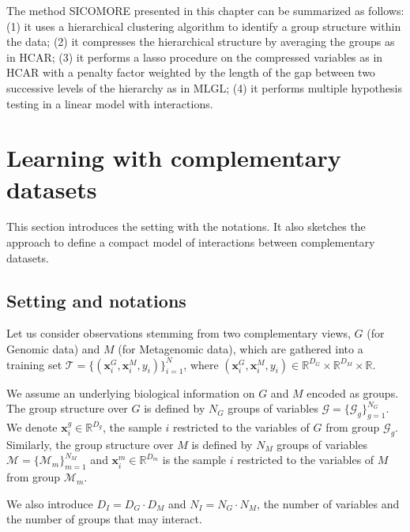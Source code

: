 \documentclass[]{book}
\begin{document}
The method SICOMORE presented in this chapter can be summarized as
follows: (1) it uses a hierarchical clustering algorithm to identify a
group structure within the data; (2) it compresses the hierarchical
structure by averaging the groups as in HCAR; (3) it performs a lasso
procedure on the compressed variables as in HCAR with a penalty factor
weighted by the length of the gap between two successive levels of the
hierarchy as in MLGL; (4) it performs multiple hypothesis testing in a
linear model with interactions.

\hypertarget{modelsicomore}{%
\section{Learning with complementary datasets}\label{modelsicomore}}

This section introduces the setting with the notations. It also sketches
the approach to define a compact model of interactions between
complementary datasets.

\hypertarget{setting-and-notations}{%
\subsection{Setting and notations}\label{setting-and-notations}}

Let us consider observations stemming from two complementary views,
\(\mathit{G}\) (for Genomic data) and \(\mathit{M}\) (for Metagenomic data), which are
gathered into a training set
\(\mathcal{T} = \{(\mathbf{x}^\mathit{G}_i, \mathbf{x}^\mathit{M}_i, y_i)\}_{i=1}^N\), where
\((\mathbf{x}^\mathit{G}_i, \mathbf{x}^\mathit{M}_i, y_i) \in \mathbb{R}^{D_\mathit{G}} \times \mathbb{R}^{D_\mathit{M}} \times \mathbb{R}\).

We assume an underlying biological information on \(\mathit{G}\) and \(\mathit{M}\)
encoded as groups. The group structure over \(\mathit{G}\) is defined by
\(N_{\mathit{G}}\) groups of variables
\(\mathcal{G}=\{\mathcal{G}_{g} \}_{g=1}^{N_{\mathit{G}}}\). We denote
\(\mathbf{x}_i^{g} \in \mathbb{R}^{D_{g}}\), the sample \(i\) restricted to the
variables of \(\mathit{G}\) from group \(\mathcal{G}_{g}\). Similarly, the group
structure over \(\mathit{M}\) is defined by \(N_{\mathit{M}}\) groups of variables
\(\mathcal{M}=\{\mathcal{M}_{m}\}_{m=1}^{N_{\mathit{M}}}\) and
\(\mathbf{x}_i^{m} \in \mathbb{R}^{D_{m}}\) is the sample \(i\) restricted to the
variables of \(\mathit{M}\) from group \(\mathcal{M}_{m}\).

We also introduce \(D_I = D_{\mathit{G}} \cdot D_{\mathit{M}}\) and
\(N_I = N_{\mathit{G}} \cdot N_{\mathit{M}}\), the number of variables and the number of
groups that may interact.
\end{document}
